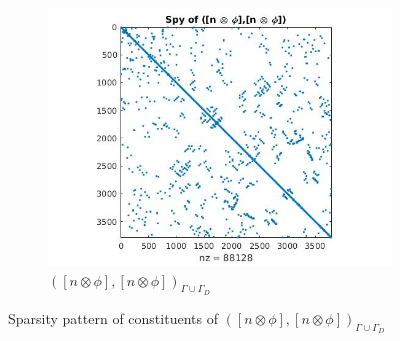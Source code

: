 \documentclass[a4paper,openany]{book}
\begin{document}
\begin{figure}
\begin{subfigure}{\textwidth}
  \includegraphics[width=\textwidth]{figure2.jpg}
  \caption{$([n \otimes \phi],[n \otimes \phi])_{\Gamma \cup \Gamma_D}$}
  \label{fig:figure2}
\end{subfigure}
\caption{Sparsity pattern of constituents of $([n \otimes \phi],[n \otimes \phi])_{\Gamma \cup \Gamma_D}$}
\label{figure_2_all}
\end{figure}
\end{document}

